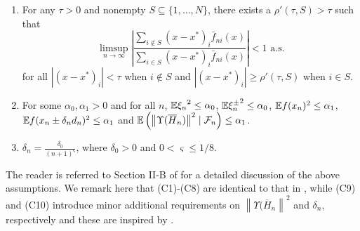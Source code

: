 \begin{enumerate}[label=(\textbf{C\arabic*})]
\item For any $\tau >0$ and nonempty $S \subseteq \{1,\ldots,N\}$, there exists a $\rho'(\tau,S)>\tau$ such that 
$$ \limsup_{n\rightarrow \infty} \left| \dfrac{\sum_{i \notin S} (x-x^*)_i \bar f_{ni}(x)}{\sum_{i \in S} (x-x^*)_i \bar f_{ni}(x)}               \right| < 1 \text{ a.s.}$$
for all $|(x-x^*)_i| < \tau$ when $i \notin S$ and $|(x-x^*)_i| \ge \rho'(\tau,S)$ when $i\in S$.
\item For some $\alpha_0, \alpha_1>0$ and for all $n$, $\mathbb{E} {\xi_n}^{2} \le \alpha_0$, $\mathbb{E} {\xi_n^{\pm}}^{2} \le \alpha_0$, $\mathbb{E} f(x_n)^{2} \le \alpha_1$,  $\mathbb{E} f(x_n\pm \delta_n d_n)^{2} \le \alpha_1$ and $\mathbb{E} \left(\left\| \Upsilon(\overline H_n) \right\|^2 \mid \mathcal{F}_n\right) \le \alpha_1$. 
\item  $\delta_n = \frac{\delta_0}{(n+1)^{\varsigma}}$, where $\delta_0 > 0$ and $0 < \varsigma \le 1/8$.
\end{enumerate}
The reader is referred to Section II-B of \cite{prashanth2015rdsa} for a detailed discussion of the above assumptions. We remark here that (C1)-(C8) are identical to that in \cite{prashanth2015rdsa}, while (C9) and (C10) introduce minor additional requirements on $\left\| \Upsilon(\overline H_n \right\|^2$ and $\delta_n$, respectively and these are inspired by \cite{spall-jacobian}.

